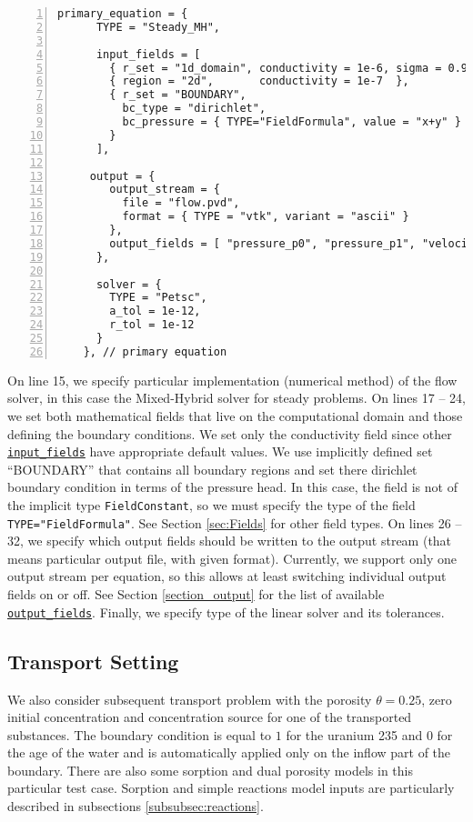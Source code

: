 \begin{Verbatim}[numbers=left, firstnumber=last]
    primary_equation = {
      TYPE = "Steady_MH", 

      input_fields = [
        { r_set = "1d_domain", conductivity = 1e-6, sigma = 0.9 },
        { region = "2d",       conductivity = 1e-7  },
        { r_set = "BOUNDARY",
          bc_type = "dirichlet",
          bc_pressure = { TYPE="FieldFormula", value = "x+y" }
        }
      ],

     output = {
        output_stream = { 
          file = "flow.pvd", 
          format = { TYPE = "vtk", variant = "ascii" }
        }, 
        output_fields = [ "pressure_p0", "pressure_p1", "velocity_p0" ]
      }, 
      
      solver = {
        TYPE = "Petsc",
        a_tol = 1e-12,
        r_tol = 1e-12
      }
    }, // primary equation
\end{Verbatim}
On line 15, we specify particular implementation (numerical method) of the flow solver, in this case the Mixed-Hybrid
solver for steady problems. On lines 17 -- 24, we set both mathematical fields that live on the computational domain 
and those defining the boundary conditions. We set only the conductivity field since other \hyperlink{IT::DarcyFlowMH-Data}{\tt input\_fields} have appropriate default values.
We use implicitly defined set ``BOUNDARY'' that contains all boundary regions and set there dirichlet boundary condition in terms of the 
pressure head. In this case, the field is not of the implicit type {\tt FieldConstant}, so we must specify the type of the field {\tt TYPE="FieldFormula"}.
See Section \ref{sec:Fields} for other field types. 
On lines 26 -- 32, we specify which output fields should be written to the output stream (that means particular output file, with given format).
Currently, we support only one output stream per equation, so this allows at least switching individual output fields on or off. 
See Section \ref{section_output} for the list of available \hyperlink{IT::DarcyMHOutput-Selection}{\tt output\_fields}.
Finally, we specify type of the linear solver and its tolerances.



\subsection{Transport Setting}
We also consider subsequent transport problem with the porosity $\theta = 0.25$, zero initial concentration and concentration source for one of the transported substances. The boundary condition is equal to $1$ for the uranium 235 and $0$ for the age of the water and is automatically applied only on the 
inflow part of the boundary. There are also some sorption and dual porosity models in this particular test case. Sorption and simple reactions model inputs are particularly described in subsections \ref{subsubsec:reactions}.%

